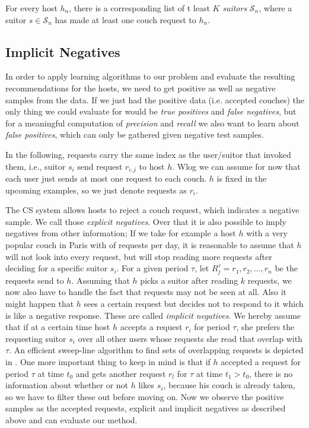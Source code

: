 \documentclass[11pt]{article}
\begin{document}
For every host $h_n$, there is a corresponding list of t least $K$ \emph{suitors} $\mathcal{S}_n$, where a suitor $s \in \mathcal{S}_n$ has made at least one couch request to $h_n$.

\subsection{Implicit Negatives}
\label{sec:implicitNeg}
In order to apply learning algorithms to our problem and evaluate the resulting recommendations for the hosts, we need to get positive as well as negative samples from the data. If we just had the positive data (i.e. accepted couches) the only thing we could evaluate for would be \textit{true positives} and \textit{false negatives}, but for a meaningful computation of \textit{precision} and \textit{recall} we also want to learn about \textit{false positives}, which can only be gathered given negative test samples.

In the following, requests carry the same index as the user/suitor that invoked them, i.e., suitor $s_i$ send request $r_{i,j}$ to host $h$. Wlog we can assume for now that each user just sends at most one request to each couch. $h$ is fixed in the upcoming examples, so we just denote requests as $r_i$.
 
The CS system allows hosts to reject a couch request, which indicates a negative sample. We call those \textit{explicit negatives}. Over that it is also possible to imply negatives from other information; If we take for example a host $h$ with a very popular couch in Paris with  of requests per day, it is reasonable to assume that $h$ will not look into every request, but will stop reading more requests after deciding for a specific suitor $s_i$. For a given period $\tau$, let $R_{j}^{\tau} = r_1, r_2,\ldots,r_n$ be the requests send to $h$. Assuming that $h$ picks a suitor after reading $k$ requests, we now also have to handle the fact that requests may not be seen at all. Also it might happen that $h$ sees a certain request but decides not to respond to it which is like a negative response. These are called \textit{implicit negatives}. We hereby assume that if at a certain time host $h$ accepts a request $r_i$ for period $\tau$, she prefers the requesting suitor $s_i$ over all other users whose requests she read that overlap with $\tau$. An efficient sweep-line algorithm to find sets of overlapping requests is depicted in . One more important thing to keep in mind is that if $h$ accepted a request for period $\tau$ at time $t_0$ and gets another request $r_l$ for $\tau$ at time $t_1 > t_0$, there is no information about whether or not $h$ likes $s_i$, because his couch is already taken, so we have to filter these out before moving on. Now we observe the positive samples as the accepted requests, explicit and implicit negatives as described above and can evaluate our method.
\end{document}
